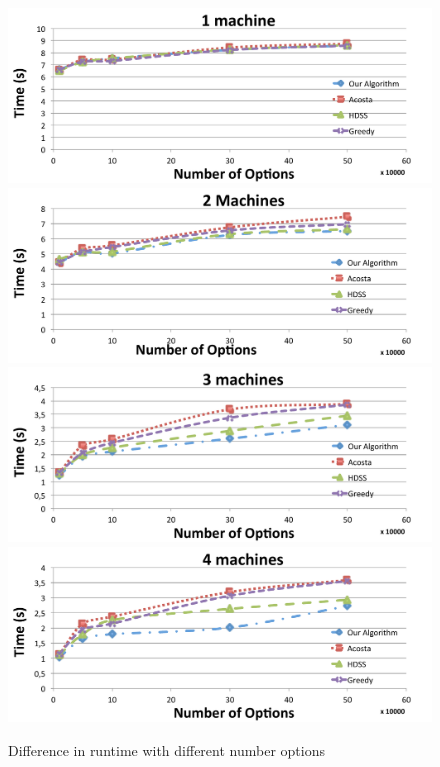 \documentclass[journal]{IEEEtran}
\begin{document}
\begin{figure}[htb]
	\begin{center}
	\centering
		\includegraphics[scale=0.3]{1machineBlack.pdf} \quad
		\includegraphics[scale=0.3]{2machineBlack.pdf} \quad
		\includegraphics[scale=0.3]{3machineBlack.pdf} \quad
		\includegraphics[scale=0.3]{4machineBlack.pdf} 
	\caption{Difference in runtime with different number options}
	\label{fig:black}
	\end{center}
\end{figure}
\end{document}
